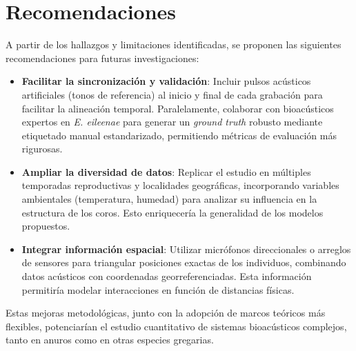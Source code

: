 \chapter*{Recomendaciones}\label{chapter:recomendations}


A partir de los hallazgos y limitaciones identificadas, se 
proponen las siguientes recomendaciones para futuras 
investigaciones:
\begin{itemize}
    \item \textbf{Facilitar la sincronización y validación}: 
    Incluir pulsos acústicos artificiales (tonos de referencia) 
    al inicio y final de cada grabación para facilitar la 
    alineación temporal. Paralelamente, colaborar con 
    bioacústicos expertos en \textit{E. eileenae} para generar 
    un \textit{ground truth} robusto mediante etiquetado manual 
    estandarizado, permitiendo métricas de evaluación más 
    rigurosas.
    
    \item \textbf{Ampliar la diversidad de datos}: Replicar el 
    estudio en múltiples temporadas reproductivas y localidades 
    geográficas, incorporando variables ambientales 
    (temperatura, humedad) para analizar su influencia en la 
    estructura de los coros. Esto enriquecería la generalidad de 
    los modelos propuestos.

    \item \textbf{Integrar información espacial}: Utilizar 
    micrófonos direccionales o arreglos de sensores para 
    triangular posiciones exactas de los individuos, combinando 
    datos acústicos con coordenadas georreferenciadas. Esta 
    información permitiría 
    modelar interacciones en función de distancias físicas.
    

\end{itemize}


Estas mejoras metodológicas, junto con la adopción de marcos 
teóricos más flexibles, potenciarían el estudio cuantitativo de 
sistemas bioacústicos complejos, tanto en anuros como en otras 
especies gregarias.